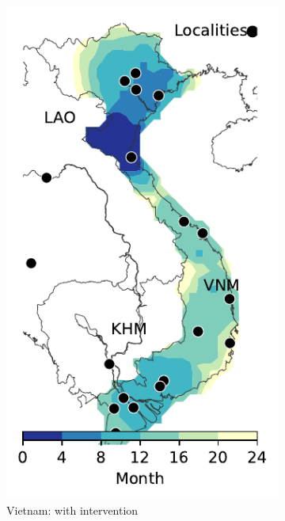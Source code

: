 \documentclass[11pt]{article}
\theoremstyle{definition}
\begin{document}
\begin{figure}[ht]
\begin{subfigure}[b]{.28\textwidth}
\includegraphics[width=\textwidth]{../cellular_automata/results/contour/VN_model-B_precip1-out-100_m1_l3.pdf}
\caption{Vietnam: with intervention\label{fig:vnmBContourInt}}
\end{subfigure}
\begin{subfigure}[b]{.43\textwidth}

\end{subfigure}
\end{figure}
\end{document}
